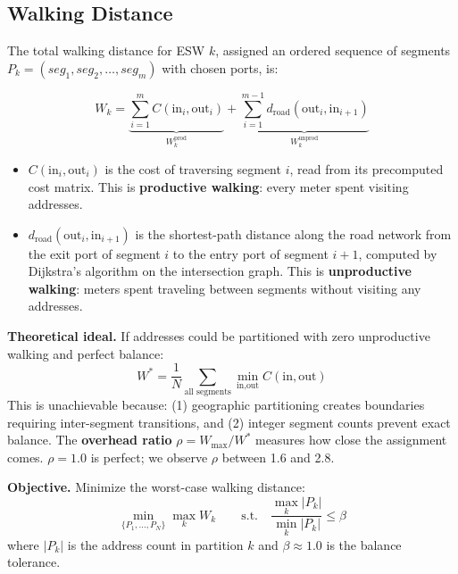 \documentclass[conference]{IEEEtran}
\begin{document}
\subsection{Walking Distance}

The total walking distance for ESW $k$, assigned an ordered sequence of segments $P_k = (seg_1, seg_2, \ldots, seg_m)$ with chosen ports, is:

\begin{equation}
W_k = \underbrace{\sum_{i=1}^{m} C(\text{in}_i, \text{out}_i)}_{\displaystyle W_k^{\text{prod}}} + \underbrace{\sum_{i=1}^{m-1} d_{\text{road}}(\text{out}_i, \text{in}_{i+1})}_{\displaystyle W_k^{\text{unprod}}}
\label{eq:walk}
\end{equation}

\begin{itemize}
\item $C(\text{in}_i, \text{out}_i)$ is the cost of traversing segment $i$, read from its precomputed cost matrix. This is \textbf{productive walking}: every meter spent visiting addresses.
\item $d_{\text{road}}(\text{out}_i, \text{in}_{i+1})$ is the shortest-path distance along the road network from the exit port of segment $i$ to the entry port of segment $i{+}1$, computed by Dijkstra's algorithm on the intersection graph. This is \textbf{unproductive walking}: meters spent traveling between segments without visiting any addresses.
\end{itemize}

\textbf{Theoretical ideal.} If addresses could be partitioned with zero unproductive walking and perfect balance:
\begin{equation}
W^* = \frac{1}{N} \sum_{\text{all segments}} \min_{\text{in}, \text{out}} C(\text{in}, \text{out})
\label{eq:ideal}
\end{equation}
This is unachievable because: (1) geographic partitioning creates boundaries requiring inter-segment transitions, and (2) integer segment counts prevent exact balance. The \textbf{overhead ratio} $\rho = W_{\max} / W^*$ measures how close the assignment comes. $\rho = 1.0$ is perfect; we observe $\rho$ between 1.6 and 2.8.

\textbf{Objective.} Minimize the worst-case walking distance:
\begin{equation}
\min_{\{P_1,\ldots,P_N\}} \max_{k} W_k \qquad \text{s.t.} \quad \frac{\max_k |P_k|}{\min_k |P_k|} \leq \beta
\label{eq:objective}
\end{equation}
where $|P_k|$ is the address count in partition $k$ and $\beta \approx 1.0$ is the balance tolerance.
\end{document}
